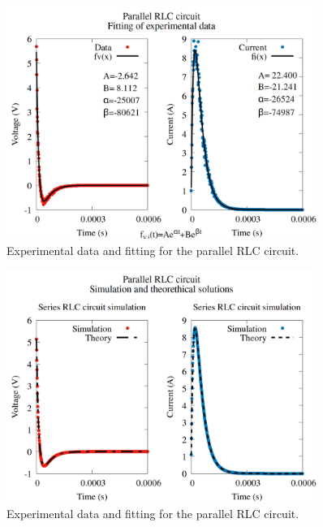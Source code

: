 \documentclass[12pt,twoside]{extarticle}
\begin{document}
\begin{figure}[ht]
    \centering
    \includegraphics[width=0.9\textwidth]{figures/parallel_exp_vs_fitting.png}
    \caption{Experimental data and fitting for the parallel RLC circuit.}
    \label{fig:parallel_evf}
\end{figure}

\begin{figure}[ht]
    \centering
    \includegraphics[width=0.9\textwidth]{figures/parallel_sim_vs_ana.png}
    \caption{Experimental data and fitting for the parallel RLC circuit.}
    \label{fig:parallel_evf}
\end{figure}
\end{document}
